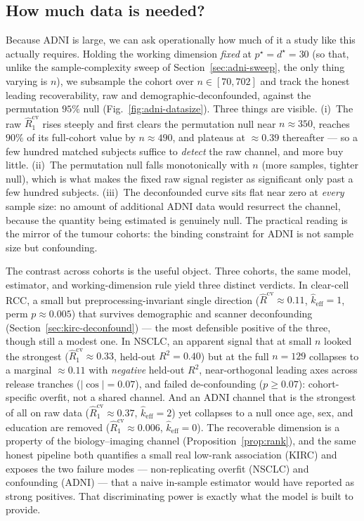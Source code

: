 \documentclass{article}
\begin{document}
\subsection{How much data is needed?}
\label{sec:adni-datasize}
Because ADNI is large, we can ask operationally how much of it a study like this
actually requires. Holding the working dimension \emph{fixed} at
$p^\star = d^\star = 30$ (so that, unlike the sample-complexity sweep of
Section~\ref{sec:adni-sweep}, the only thing varying is $n$), we subsample the
cohort over $n \in [70, 702]$ and track the honest leading recoverability, raw
and demographic-deconfounded, against the permutation $95\%$ null
(Fig.~\ref{fig:adni-datasize}). Three things are visible. (i)~The raw
$\hat R_1^{\mathrm{cv}}$ rises steeply and first clears the permutation null near
$n \approx 350$, reaches $90\%$ of its full-cohort value by $n \approx 490$, and
plateaus at $\approx 0.39$ thereafter --- so a few hundred matched subjects
suffice to \emph{detect} the raw channel, and more buy little. (ii)~The permutation null
falls monotonically with $n$ (more samples, tighter null), which is what makes
the fixed raw signal register as significant only past a few hundred subjects.
(iii)~The deconfounded curve sits flat near zero at \emph{every} sample size:
no amount of additional ADNI data would resurrect the channel, because the
quantity being estimated is genuinely null. The practical reading is the
mirror of the tumour cohorts: the binding constraint for ADNI is not sample
size but confounding.


The contrast across cohorts is the useful object. Three cohorts, the same
model, estimator, and working-dimension rule yield three distinct verdicts.
In clear-cell RCC, a small but preprocessing-invariant single direction
($\hat R^{\mathrm{cv}}\approx 0.11$, $\hat k_{\mathrm{eff}}=1$, perm
$p\approx 0.005$) that survives demographic and scanner deconfounding
(Section~\ref{sec:kirc-deconfound}) --- the most defensible positive of the
three, though still a modest one. In NSCLC, an
apparent signal that at small $n$ looked the strongest
($\hat R_1^{\mathrm{cv}}\approx 0.33$, held-out $R^2 = 0.40$) but at the full
$n = 129$ collapses to a marginal $\approx 0.11$ with \emph{negative} held-out
$R^2$, near-orthogonal leading axes across release tranches ($|\cos| = 0.07$),
and failed de-confounding ($p \ge 0.07$): cohort-specific overfit, not a shared
channel. And an ADNI channel that is the strongest of all on raw data
($\hat R_1^{\mathrm{cv}}\approx 0.37$, $\hat k_{\mathrm{eff}}=2$) yet collapses
to a null once age, sex, and education are removed
($\hat R_1^{\mathrm{cv}}\approx 0.006$, $\hat k_{\mathrm{eff}}=0$). The
recoverable dimension is a property of the biology--imaging channel
(Proposition~\ref{prop:rank}), and the same honest pipeline both quantifies a
small real low-rank association (KIRC) and exposes the two failure modes ---
non-replicating overfit (NSCLC) and confounding (ADNI) --- that a naive
in-sample estimator would have reported as strong positives. That discriminating
power is exactly what the model is built to provide.
\end{document}

